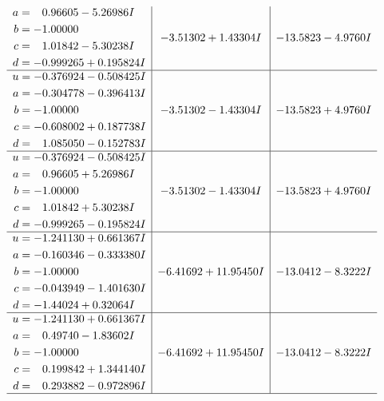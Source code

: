 \documentclass[1p]{elsarticle_modified}
\theoremstyle{definition}
\begin{document}
$$\begin{array}{c|c|c}
\begin{aligned}
a &= \phantom{-}0.96605 - 5.26986 I \\
b &= -1.00000\phantom{ +0.000000I} \\
c &= \phantom{-}1.01842 - 5.30238 I \\
d &= -0.999265 + 0.195824 I\end{aligned}
 & -3.51302 + 1.43304 I & -13.5823 - 4.9760 I \\ \hline\begin{aligned}
u &= -0.376924 - 0.508425 I \\
a &= -0.304778 - 0.396413 I \\
b &= -1.00000\phantom{ +0.000000I} \\
c &= -0.608002 + 0.187738 I \\
d &= \phantom{-}1.085050 - 0.152783 I\end{aligned}
 & -3.51302 - 1.43304 I & -13.5823 + 4.9760 I \\ \hline\begin{aligned}
u &= -0.376924 - 0.508425 I \\
a &= \phantom{-}0.96605 + 5.26986 I \\
b &= -1.00000\phantom{ +0.000000I} \\
c &= \phantom{-}1.01842 + 5.30238 I \\
d &= -0.999265 - 0.195824 I\end{aligned}
 & -3.51302 - 1.43304 I & -13.5823 + 4.9760 I \\ \hline\begin{aligned}
u &= -1.241130 + 0.661367 I \\
a &= -0.160346 - 0.333380 I \\
b &= -1.00000\phantom{ +0.000000I} \\
c &= -0.043949 - 1.401630 I \\
d &= -1.44024 + 0.32064 I\end{aligned}
 & -6.41692 + 11.95450 I & -13.0412 - 8.3222 I \\ \hline\begin{aligned}
u &= -1.241130 + 0.661367 I \\
a &= \phantom{-}0.49740 - 1.83602 I \\
b &= -1.00000\phantom{ +0.000000I} \\
c &= \phantom{-}0.199842 + 1.344140 I \\
d &= \phantom{-}0.293882 - 0.972896 I\end{aligned}
 & -6.41692 + 11.95450 I & -13.0412 - 8.3222 I\\
 \hline 
 \end{array}$$\newpage$$\begin{array}{c|c|c}  

\end{array}$$
\end{document}
